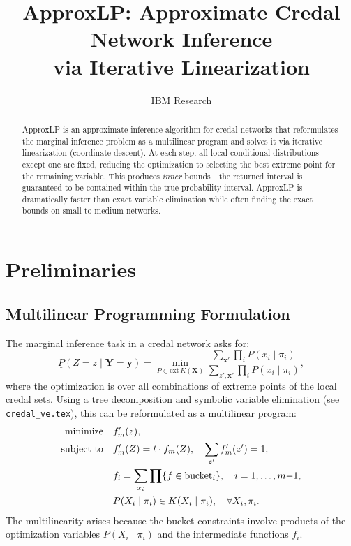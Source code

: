 \documentclass[11pt]{article}
\title{ApproxLP: Approximate Credal Network Inference\\via Iterative Linearization}
\author{IBM Research}
\date{}
\begin{document}
\maketitle

\begin{abstract}
ApproxLP is an approximate inference algorithm for credal networks that reformulates
the marginal inference problem as a multilinear program and solves it via iterative
linearization (coordinate descent). At each step, all local conditional distributions
except one are fixed, reducing the optimization to selecting the best extreme point for
the remaining variable. This produces \emph{inner} bounds---the returned interval is
guaranteed to be contained within the true probability interval. ApproxLP is
dramatically faster than exact variable elimination while often finding the exact bounds
on small to medium networks.
\end{abstract}

\section{Preliminaries}

\subsection{Multilinear Programming Formulation}

The marginal inference task in a credal network asks for:
\[
  \underline{P}(Z{=}z \mid \mathbf{Y}{=}\mathbf{y}) = \min_{P \in \mathrm{ext}\,K(\mathbf{X})}
  \frac{\sum_{\mathbf{x}'} \prod_i P(x_i \mid \pi_i)}
       {\sum_{z',\mathbf{x}'} \prod_i P(x_i \mid \pi_i)},
\]
where the optimization is over all combinations of extreme points of the local credal
sets. Using a tree decomposition and symbolic variable elimination (see \texttt{credal\_ve.tex}),
this can be reformulated as a multilinear program:
\begin{align}
  \text{minimize}\quad & f'_m(z), \label{eq:mlp-obj}\\
  \text{subject to}\quad & f'_m(Z) = t \cdot f_m(Z), \quad \sum_{z'} f'_m(z') = 1, \notag\\
  & f_i = \sum_{x_i} \prod\{f \in \text{bucket}_i\}, \quad i = 1,\dots,m{-}1, \notag\\
  & P(X_i \mid \pi_i) \in K(X_i \mid \pi_i), \quad \forall X_i, \pi_i. \notag
\end{align}
The multilinearity arises because the bucket constraints involve products of the
optimization variables $P(X_i \mid \pi_i)$ and the intermediate functions $f_i$.
\end{document}
